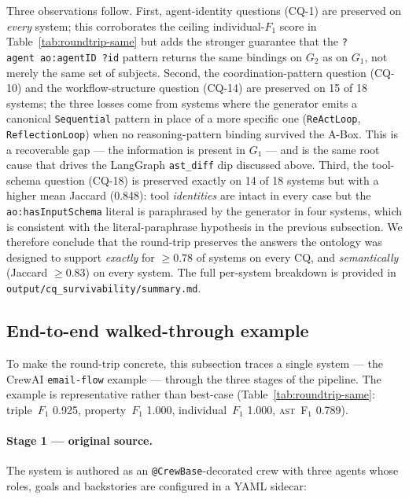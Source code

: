 Three observations follow.
First, agent-identity questions (CQ-1) are preserved on \emph{every}
system; this corroborates the ceiling individual-$F_1$ score in
Table~\ref{tab:roundtrip-same} but adds the stronger guarantee that
the \texttt{?agent~ao:agentID~?id} pattern returns the same bindings
on $G_2$ as on $G_1$, not merely the same set of subjects.
Second, the coordination-pattern question (CQ-10) and the
workflow-structure question (CQ-14) are preserved on 15 of 18 systems;
the three losses come from systems where the generator emits a
canonical \texttt{Sequential} pattern in place of a more specific one
(\texttt{ReActLoop}, \texttt{ReflectionLoop}) when no reasoning-pattern
binding survived the A-Box. This is a recoverable gap — the
information is present in $G_1$ — and is the same root cause that
drives the LangGraph \texttt{ast\_diff} dip discussed above.
Third, the tool-schema question (CQ-18) is preserved exactly on
14 of 18 systems but with a higher mean Jaccard (0.848): tool
\emph{identities} are intact in every case but the
\texttt{ao:hasInputSchema} literal is paraphrased by the generator
in four systems, which is consistent with the literal-paraphrase
hypothesis in the previous subsection. We therefore conclude that the
round-trip preserves the answers the ontology was designed to support
\emph{exactly} for $\geq 0.78$ of systems on every CQ, and
\emph{semantically} (Jaccard $\geq 0.83$) on every system. The full
per-system breakdown is provided in
\texttt{output/cq\_survivability/summary.md}.

\subsection{End-to-end walked-through example}\label{sec:walkthrough}

To make the round-trip concrete, this subsection traces a single
system — the CrewAI \texttt{email-flow} example — through the three
stages of the pipeline. The example is representative rather than
best-case (Table~\ref{tab:roundtrip-same}: triple~$F_1$ 0.925,
property~$F_1$ 1.000, individual~$F_1$ 1.000,
\textsc{ast}~F$_1$ 0.789).

\paragraph{Stage 1 — original source.}
The system is authored as an \texttt{@CrewBase}-decorated crew with
three agents whose roles, goals and backstories are configured in a
YAML sidecar:

